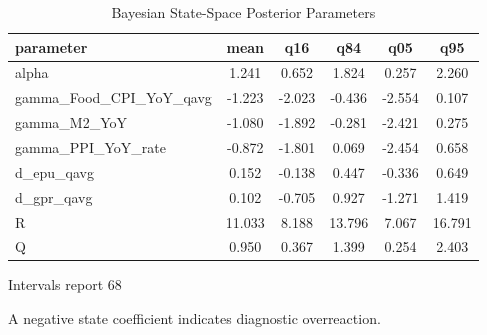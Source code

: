\begin{table}[!htbp]
\centering
\caption{Bayesian State-Space Posterior Parameters}
\label{tab:ssm_posterior_params}
\begin{threeparttable}
\begin{tabular}{lccccc}
\toprule
parameter & mean & q16 & q84 & q05 & q95 \\
\midrule
alpha & 1.241 & 0.652 & 1.824 & 0.257 & 2.260 \\
gamma\_Food\_CPI\_YoY\_qavg & -1.223 & -2.023 & -0.436 & -2.554 & 0.107 \\
gamma\_M2\_YoY & -1.080 & -1.892 & -0.281 & -2.421 & 0.275 \\
gamma\_PPI\_YoY\_rate & -0.872 & -1.801 & 0.069 & -2.454 & 0.658 \\
d\_epu\_qavg & 0.152 & -0.138 & 0.447 & -0.336 & 0.649 \\
d\_gpr\_qavg & 0.102 & -0.705 & 0.927 & -1.271 & 1.419 \\
R & 11.033 & 8.188 & 13.796 & 7.067 & 16.791 \\
Q & 0.950 & 0.367 & 1.399 & 0.254 & 2.403 \\
\bottomrule
\end{tabular}
\begin{tablenotes}[flushleft]
\footnotesize
\item Intervals report 68%
\item A negative state coefficient indicates diagnostic overreaction.
\end{tablenotes}
\end{threeparttable}
\end{table}
